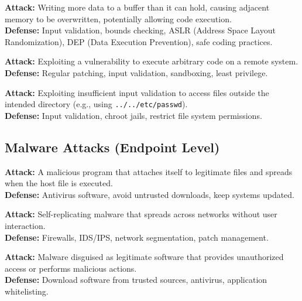 \documentclass[11pt,a4paper]{article}
\begin{document}
\begin{alertbox}
\textbf{Attack:} Writing more data to a buffer than it can hold, causing adjacent memory to be overwritten, potentially allowing code execution.\\
\textbf{Defense:} Input validation, bounds checking, ASLR (Address Space Layout Randomization), DEP (Data Execution Prevention), safe coding practices.
\end{alertbox}

\begin{alertbox}
\textbf{Attack:} Exploiting a vulnerability to execute arbitrary code on a remote system.\\
\textbf{Defense:} Regular patching, input validation, sandboxing, least privilege.
\end{alertbox}

\begin{alertbox}
\textbf{Attack:} Exploiting insufficient input validation to access files outside the intended directory (e.g., using \texttt{../../etc/passwd}).\\
\textbf{Defense:} Input validation, chroot jails, restrict file system permissions.
\end{alertbox}

\subsection{Malware Attacks (Endpoint Level)}

\begin{alertbox}[Virus]
\textbf{Attack:} A malicious program that attaches itself to legitimate files and spreads when the host file is executed.\\
\textbf{Defense:} Antivirus software, avoid untrusted downloads, keep systems updated.
\end{alertbox}

\begin{alertbox}[Worm]
\textbf{Attack:} Self-replicating malware that spreads across networks without user interaction.\\
\textbf{Defense:} Firewalls, IDS/IPS, network segmentation, patch management.
\end{alertbox}

\begin{alertbox}
\textbf{Attack:} Malware disguised as legitimate software that provides unauthorized access or performs malicious actions.\\
\textbf{Defense:} Download software from trusted sources, antivirus, application whitelisting.
\end{alertbox}
\end{document}
